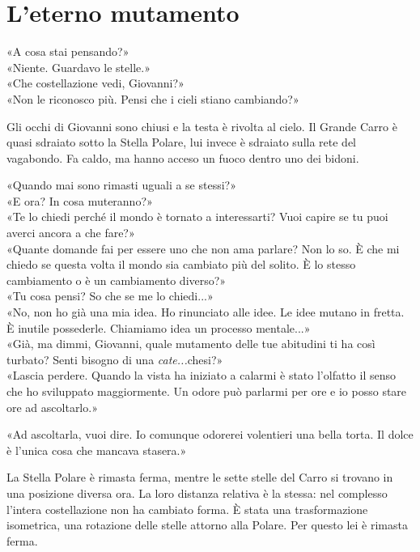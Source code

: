 \chapter{L’eterno mutamento}

«A cosa stai pensando?»\\
«Niente. Guardavo le stelle.»\\
«Che costellazione vedi, Giovanni?»\\
«Non le riconosco pi\`u. Pensi che i cieli stiano cambiando?»





\par\medskip
Gli occhi di Giovanni sono chiusi e la testa \`e rivolta al cielo.
Il Grande Carro \`e quasi sdraiato sotto la Stella Polare,
lui invece \`e sdraiato sulla rete del vagabondo.
Fa caldo, ma hanno acceso un fuoco dentro uno dei bidoni.

\par\medskip
«Quando mai sono rimasti uguali a se stessi?»\\
«E ora? In cosa muteranno?»\\
«Te lo chiedi perch\'e il mondo \`e tornato a interessarti?
Vuoi capire se tu puoi averci ancora a che fare?»\\
«Quante domande fai per essere uno che non ama parlare?
Non lo so. \`E che mi chiedo se questa volta il mondo sia cambiato pi\`u del solito.
\`E lo stesso cambiamento o \`e un cambiamento diverso?»\\
«Tu cosa pensi? So che se me lo chiedi...»\\
«No, non ho gi\`a una mia idea. Ho rinunciato alle idee.
Le idee mutano in fretta. \`E inutile possederle.
Chiamiamo idea un processo mentale...»\\
«Già, ma dimmi, Giovanni, quale mutamento delle tue abitudini ti ha cos\`i turbato?
Senti bisogno di una \emph{cate...}chesi?»\\
«Lascia perdere. Quando la vista ha iniziato a calarmi \`e stato l’olfatto il senso che ho sviluppato maggiormente.
Un odore pu\`o parlarmi per ore e io posso stare ore ad ascoltarlo.»

\par\medskip
«Ad ascoltarla, vuoi dire. Io comunque odorerei volentieri una bella torta.
Il dolce \`e l’unica cosa che mancava stasera.»

\par\medskip
La Stella Polare \`e rimasta ferma, mentre le sette stelle del Carro si trovano in una posizione diversa ora.
La loro distanza relativa \`e la stessa: nel complesso l’intera costellazione non ha cambiato forma.
\`E stata una trasformazione isometrica, una rotazione delle stelle attorno alla Polare.
Per questo lei \`e rimasta ferma.

